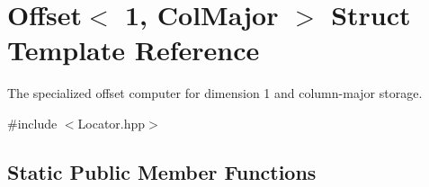 \hypertarget{struct_d_o_1_1_offset_3_011_00_01_col_major_01_4}{\section{Offset$<$ 1, Col\-Major $>$ Struct Template Reference}
\label{struct_d_o_1_1_offset_3_011_00_01_col_major_01_4}
}


The specialized offset computer for dimension 1 and column-\/major storage.  




{\ttfamily \#include $<$Locator.\-hpp$>$}

\subsection*{Static Public Member Functions}
